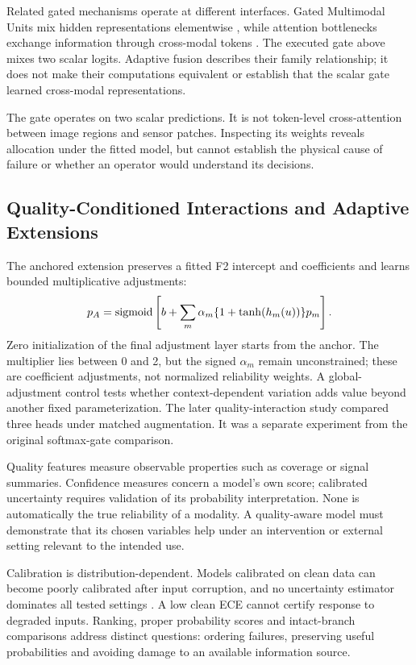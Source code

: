 Related gated mechanisms operate at different interfaces. Gated Multimodal Units mix hidden representations elementwise \citep{P006}, while attention bottlenecks exchange information through cross-modal tokens \citep{Nagrani2021MBT}. The executed gate above mixes two scalar logits. Adaptive fusion describes their family relationship; it does not make their computations equivalent or establish that the scalar gate learned cross-modal representations.

The gate operates on two scalar predictions. It is not token-level cross-attention between image regions and sensor patches. Inspecting its weights reveals allocation under the fitted model, but cannot establish the physical cause of failure or whether an operator would understand its decisions.

\subsection{Quality-Conditioned Interactions and Adaptive Extensions}
The anchored extension preserves a fitted F2 intercept and coefficients and learns bounded multiplicative adjustments:
\begin{equation}
 p_A=\operatorname{sigmoid}\left[b+\sum_m\alpha_m\{1+\tanh(h_m(u))\}p_m\right].
 \label{eq:anchored}
\end{equation}
Zero initialization of the final adjustment layer starts from the anchor. The multiplier lies between 0 and 2, but the signed $\alpha_m$ remain unconstrained; these are coefficient adjustments, not normalized reliability weights. A global-adjustment control tests whether context-dependent variation adds value beyond another fixed parameterization. The later quality-interaction study compared three heads under matched augmentation. It was a separate experiment from the original softmax-gate comparison.

Quality features measure observable properties such as coverage or signal summaries. Confidence measures concern a model's own score; calibrated uncertainty requires validation of its probability interpretation. None is automatically the true reliability of a modality. A quality-aware model must demonstrate that its chosen variables help under an intervention or external setting relevant to the intended use.

Calibration is distribution-dependent. Models calibrated on clean data can become poorly calibrated after input corruption, and no uncertainty estimator dominates all tested settings \citep{P008}. A low clean ECE cannot certify response to degraded inputs. Ranking, proper probability scores and intact-branch comparisons address distinct questions: ordering failures, preserving useful probabilities and avoiding damage to an available information source.

